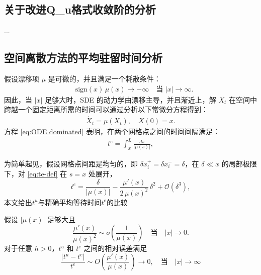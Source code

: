 \subsection{关于改进Q_u格式收敛阶的分析}

...

\subsection{空间离散方法的平均驻留时间分析}
假设漂移项 $\mu$ 是可微的，并且满足一个耗散条件：
\begin{align}
	\quad \text{sign}(x)\,\mu(x) \to -\infty \quad \text{当 } |x|\to\infty.
\end{align}
因此，当 $|x|$ 足够大时，SDE 的动力学由漂移主导，并且渐近上，解 $X_t$ 在空间中跨越一个固定距离所需的时间可以通过分析以下常微分方程得到：
\begin{align} \label{eq:ODE dominated}
	\dot{X_t} = \mu(X_t), \quad X(0)=x.
\end{align}
方程 \eqref{eq:ODE dominated} 表明，在两个网格点之间的时间间隔满足：
\begin{align}\label{eq:te-def}
	t^e = \int_{x}^{L} \frac{ds}{|\mu(s)|}, 
\end{align}

为简单起见，假设网格点间距是均匀的，即 $\delta x_i^+ = \delta x_i^- = \delta$，在 $\delta\ll x$ 的局部极限下，对 \eqref{eq:te-def} 在 $s=x$ 处展开，
\begin{equation}\label{eq:te-local-expansion}
	t^e
	=\frac{\delta}{|\mu(x)|}
	-\frac{\mu'(x)}{2\,\mu(x)^2}\,\delta^2
	+\mathcal{O}(\delta^3),
\end{equation}
%
本文给出\(t^u\)与精确平均等待时间\(t^e\)的比较
%

\begin{theorem}
	假设 $|\mu(x)|$ 足够大且
	\[
	\frac{\mu'(x)}{\mu(x)^2} \sim o\left(\frac{1}{\mu(x)}\right) \quad \text{当} \quad |x| \to 0.
	\]
	对于任意 $h > 0$，$t^u$ 和 $t^e$ 之间的相对误差满足
	\[
	\frac{|t^u - t^e|}{t^e} \sim O\left(\frac{\mu'(x)}{\mu(x)}\right) \to 0, \quad \text{当} \quad |x| \to \infty
	\]

\end{theorem}


